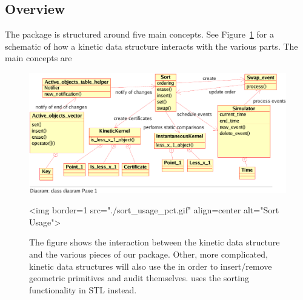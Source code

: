 \subsection{Overview}
\label{sec:overview}
The package is structured around five main concepts. See
Figure~\ref{uml_usage} for a schematic of how a kinetic data
structure interacts with the various parts. The main concepts are
 
\begin{figure}
\begin{ccTexOnly}
\begin{center}
\includegraphics[scale=.8,viewport=0 18 470 250, clip]{Kinetic_data_structures/sort_usage_pct}
\end{center}
\end{ccTexOnly}
\begin{ccHtmlOnly}
<img border=1 src="./sort_usage_pct.gif" align=center alt="Sort Usage">
\end{ccHtmlOnly}
\caption{\label{uml_usage} The figure shows the interaction between
  the  kinetic data structure and
  the various pieces of our package.  Other, more complicated, kinetic
  data structures will also use the  in order
  to insert/remove geometric primitives and audit
  themselves.  uses the sorting
  functionality in STL instead.}
\end{figure}

